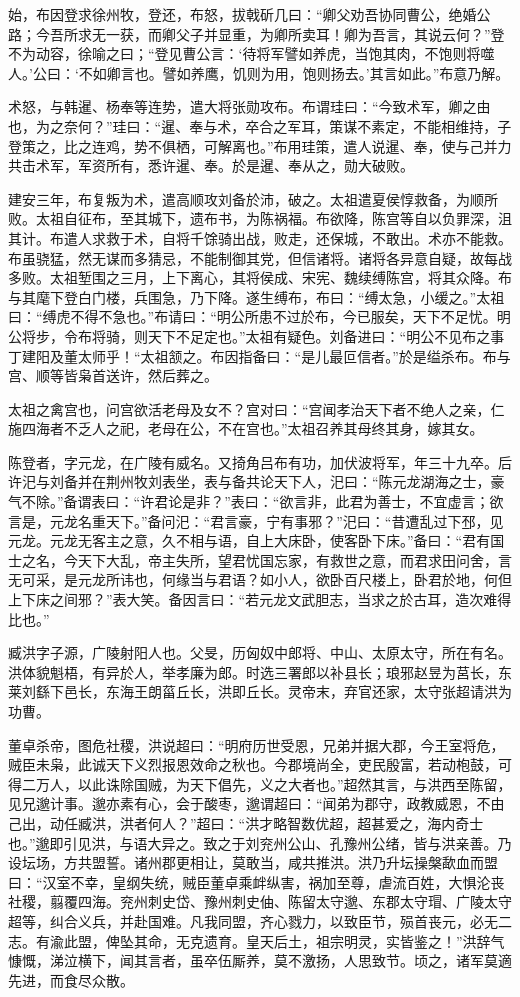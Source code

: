 \documentclass[12pt,UTF8]{ctexbook}
\begin{document}
始，布因登求徐州牧，登还，布怒，拔戟斫几曰：“卿父劝吾协同曹公，绝婚公路；今吾所求无一获，而卿父子并显重，为卿所卖耳！卿为吾言，其说云何？”登不为动容，徐喻之曰；“登见曹公言：‘待将军譬如养虎，当饱其肉，不饱则将噬人。’公曰：‘不如卿言也。譬如养鹰，饥则为用，饱则扬去。’其言如此。”布意乃解。

术怒，与韩暹、杨奉等连势，遣大将张勋攻布。布谓珪曰：“今致术军，卿之由也，为之奈何？”珪曰：“暹、奉与术，卒合之军耳，策谋不素定，不能相维持，子登策之，比之连鸡，势不俱栖，可解离也。”布用珪策，遣人说暹、奉，使与己并力共击术军，军资所有，悉许暹、奉。於是暹、奉从之，勋大破败。

建安三年，布复叛为术，遣高顺攻刘备於沛，破之。太祖遣夏侯惇救备，为顺所败。太祖自征布，至其城下，遗布书，为陈祸福。布欲降，陈宫等自以负罪深，沮其计。布遣人求救于术，自将千馀骑出战，败走，还保城，不敢出。术亦不能救。布虽骁猛，然无谋而多猜忌，不能制御其党，但信诸将。诸将各异意自疑，故每战多败。太祖堑围之三月，上下离心，其将侯成、宋宪、魏续缚陈宫，将其众降。布与其麾下登白门楼，兵围急，乃下降。遂生缚布，布曰：“缚太急，小缓之。”太祖曰：“缚虎不得不急也。”布请曰：“明公所患不过於布，今已服矣，天下不足忧。明公将步，令布将骑，则天下不足定也。”太祖有疑色。刘备进曰：“明公不见布之事丁建阳及董太师乎！“太祖颔之。布因指备曰：“是儿最叵信者。”於是缢杀布。布与宫、顺等皆枭首送许，然后葬之。

太祖之禽宫也，问宫欲活老母及女不？宫对曰：“宫闻孝治天下者不绝人之亲，仁施四海者不乏人之祀，老母在公，不在宫也。”太祖召养其母终其身，嫁其女。

陈登者，字元龙，在广陵有威名。又掎角吕布有功，加伏波将军，年三十九卒。后许汜与刘备并在荆州牧刘表坐，表与备共论天下人，汜曰：“陈元龙湖海之士，豪气不除。”备谓表曰：“许君论是非？”表曰：“欲言非，此君为善士，不宜虚言；欲言是，元龙名重天下。”备问汜：“君言豪，宁有事邪？”汜曰：“昔遭乱过下邳，见元龙。元龙无客主之意，久不相与语，自上大床卧，使客卧下床。”备曰：“君有国士之名，今天下大乱，帝主失所，望君忧国忘家，有救世之意，而君求田问舍，言无可采，是元龙所讳也，何缘当与君语？如小人，欲卧百尺楼上，卧君於地，何但上下床之间邪？”表大笑。备因言曰：“若元龙文武胆志，当求之於古耳，造次难得比也。”

臧洪字子源，广陵射阳人也。父旻，历匈奴中郎将、中山、太原太守，所在有名。洪体貌魁梧，有异於人，举孝廉为郎。时选三署郎以补县长；琅邪赵昱为莒长，东莱刘繇下邑长，东海王朗菑丘长，洪即丘长。灵帝末，弃官还家，太守张超请洪为功曹。

董卓杀帝，图危社稷，洪说超曰：“明府历世受恩，兄弟并据大郡，今王室将危，贼臣未枭，此诚天下义烈报恩效命之秋也。今郡境尚全，吏民殷富，若动枹鼓，可得二万人，以此诛除国贼，为天下倡先，义之大者也。”超然其言，与洪西至陈留，见兄邈计事。邈亦素有心，会于酸枣，邈谓超曰：“闻弟为郡守，政教威恩，不由己出，动任臧洪，洪者何人？”超曰：“洪才略智数优超，超甚爱之，海内奇士也。”邈即引见洪，与语大异之。致之于刘兖州公山、孔豫州公绪，皆与洪亲善。乃设坛场，方共盟誓。诸州郡更相让，莫敢当，咸共推洪。洪乃升坛操槃歃血而盟曰：“汉室不幸，皇纲失统，贼臣董卓乘衅纵害，祸加至尊，虐流百姓，大惧沦丧社稷，翦覆四海。兖州刺史岱、豫州刺史伷、陈留太守邈、东郡太守瑁、广陵太守超等，纠合义兵，并赴国难。凡我同盟，齐心戮力，以致臣节，殒首丧元，必无二志。有渝此盟，俾坠其命，无克遗育。皇天后土，祖宗明灵，实皆鉴之！”洪辞气慷慨，涕泣横下，闻其言者，虽卒伍厮养，莫不激扬，人思致节。顷之，诸军莫適先进，而食尽众散。
\end{document}
